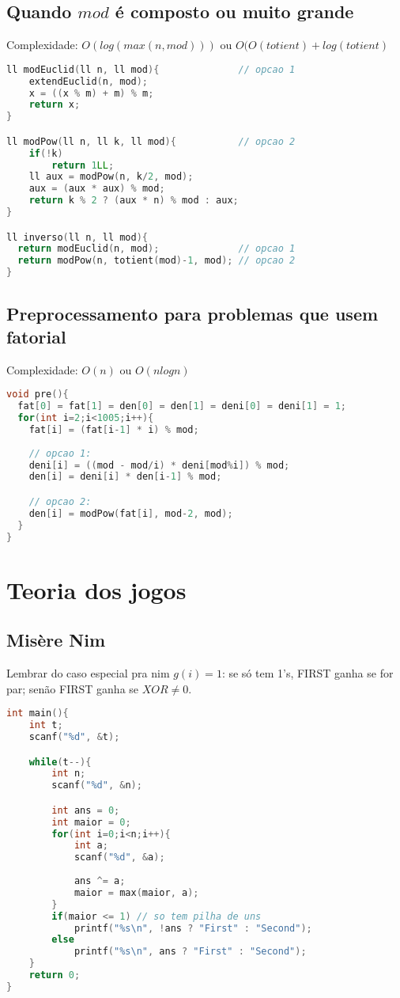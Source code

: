 \documentclass[12pt,a4paper,twoside]{report}
\begin{document}
\subsection{Quando $mod$ é composto ou muito grande}
Complexidade: $O(log(max(n, mod)))$ ou $O(O(totient) + log(totient)$
\noindent\begin{lstlisting}[caption=Inverso modular para números compostos ou grandes,language=C++]
ll modEuclid(ll n, ll mod){              // opcao 1
    extendEuclid(n, mod);
    x = ((x % m) + m) % m;
    return x;
}

ll modPow(ll n, ll k, ll mod){           // opcao 2
    if(!k) 
        return 1LL;
    ll aux = modPow(n, k/2, mod);
    aux = (aux * aux) % mod;
    return k % 2 ? (aux * n) % mod : aux;
}

ll inverso(ll n, ll mod){
  return modEuclid(n, mod);              // opcao 1
  return modPow(n, totient(mod)-1, mod); // opcao 2
}
\end{lstlisting}

\subsection{Preprocessamento para problemas que usem fatorial}
Complexidade: $O(n)$ ou $O(n log n)$
\noindent\begin{lstlisting}[caption=Preprocessamento,language=C++]
void pre(){
  fat[0] = fat[1] = den[0] = den[1] = deni[0] = deni[1] = 1;
  for(int i=2;i<1005;i++){
    fat[i] = (fat[i-1] * i) % mod;
    
    // opcao 1:
    deni[i] = ((mod - mod/i) * deni[mod%i]) % mod;
    den[i] = deni[i] * den[i-1] % mod;

    // opcao 2:
    den[i] = modPow(fat[i], mod-2, mod);
  }
}
\end{lstlisting}


\section{Teoria dos jogos}

\subsection{Misère Nim}
Lembrar do caso especial pra nim $g(i) = 1$: se só tem 1's, FIRST ganha se for par; senão FIRST ganha se $XOR \neq 0$.

\noindent\begin{lstlisting}[caption=Misère Nim,language=C++]
int main(){
    int t;
    scanf("%d", &t);

    while(t--){
        int n;
        scanf("%d", &n);

        int ans = 0;
        int maior = 0;
        for(int i=0;i<n;i++){
            int a;
            scanf("%d", &a);
            
            ans ^= a;
            maior = max(maior, a);
        }
        if(maior <= 1) // so tem pilha de uns
            printf("%s\n", !ans ? "First" : "Second");
        else
            printf("%s\n", ans ? "First" : "Second");
    }
    return 0;
}
\end{lstlisting}
\end{document}
